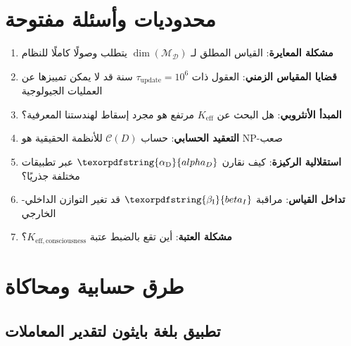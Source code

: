 \documentclass[12pt,a4paper]{article}
\DeclareRobustCommand{\alD}{\texorpdfstring{\ensuremath{\alpha_{\mathrm{D}}}}{alpha_D}}
\DeclareRobustCommand{\beI}{\texorpdfstring{\ensuremath{\beta_{\mathrm{I}}}}{beta_I}}
\newcommand{\eff}{\mathrm{eff}}
\newcommand{\Dict}{\mathcal{D}}
\newcommand{\Mdict}{\mathcal{M}_{\Dict}}
\newcommand{\Ke}{K_{\eff}}
\begin{document}
	\section{محدوديات وأسئلة مفتوحة}
	
	\begin{enumerate}
		\item \textbf{مشكلة المعايرة}: القياس المطلق لـ \(\dim(\Mdict)\) يتطلب وصولًا كاملًا للنظام
		\item \textbf{قضايا المقياس الزمني}: العقول ذات \(\tau_{\mathrm{update}} = 10^6\) سنة قد لا يمكن تمييزها عن العمليات الجيولوجية
		\item \textbf{المبدأ الأنثروبي}: هل البحث عن \(\Ke\) مرتفع هو مجرد إسقاط لهندستنا المعرفية؟
		\item \textbf{التعقيد الحسابي}: حساب \(\mathcal{C}(D)\) للأنظمة الحقيقية هو NP-صعب
		\item \textbf{استقلالية الركيزة}: كيف نقارن \(\alD\) عبر تطبيقات مختلفة جذريًا؟
		\item \textbf{تداخل القياس}: مراقبة \(\beI\) قد تغير التوازن الداخلي-الخارجي
		\item \textbf{مشكلة العتبة}: أين تقع بالضبط عتبة \(K_{\eff,\mathrm{consciousness}}\)؟
	\end{enumerate}
	
	\section{طرق حسابية ومحاكاة}
	
	\subsection{تطبيق بلغة بايثون لتقدير المعاملات}
	
\end{document}
